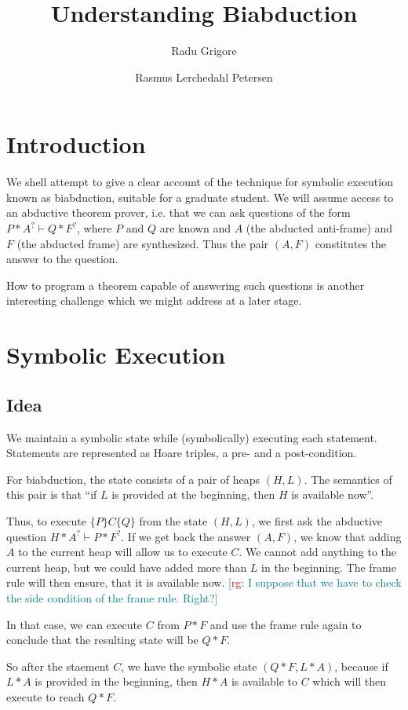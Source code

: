 \documentclass{article}
\title{Understanding Biabduction}
\author{Radu Grigore \and Rasmus Lerchedahl Petersen}
\newcommand{\note}[2]{\textcolor{teal}{[\textcolor{red}{#1}: #2]}}
\newcommand{\rg}[1]{\note{rg}{#1}}
\newcommand{\hoare}[3]{\{#1\}#2\{#3\}}
\newcommand{\ts}{\vdash} %
\begin{document}
\maketitle
\section{Introduction}\label{sec:intro}
We shell attempt to give a clear account of the technique for symbolic
execution known as biabduction, suitable for a graduate student. We
will assume access to an abductive theorem prover, i.e. that we can
ask questions of the form $P * A^? \ts Q * F^?$, where $P$ and $Q$ are
known and $A$ (the abducted anti-frame) and $F$ (the abducted frame)
are synthesized. Thus the pair $(A, F)$ constitutes the answer to the
question.

How to program a theorem capable of answering such questions is
another interesting challenge which we might address at a later stage.
\section{Symbolic Execution}\label{sec:symbexe}
\subsection{Idea}\label{sec:symbexe:idea}
We maintain a symbolic state while (symbolically) executing each
statement. Statements are represented as Hoare triples, a pre- and a
post-condition.

For biabduction, the state consists of a pair of heaps $(H, L)$. The
semantics of this pair is that ``if $L$ is provided at the beginning,
then $H$ is available now''.

Thus, to execute $\hoare P C Q$ from the state $(H, L)$, we first ask
the abductive question $H * A^? \ts P * F^?$. If we get back the answer
$(A, F)$, we know that adding $A$ to the current heap will allow us to
execute $C$. We cannot add anything to the current heap, but we could
have added more than $L$ in the beginning. The frame rule will then
ensure, that it is available now. \rg{I suppose that we have to check
the side condition of the frame rule. Right?}

In that case, we can execute $C$ from $P * F$ and use the frame rule
again to conclude that the resulting state will be $Q * F$.

So after the staement $C$, we have the symbolic state $(Q * F, L *
A)$, because if $L * A$ is provided in the beginning, then $H * A$ is
available to $C$ which will then execute to reach $Q * F$.
\end{document}
